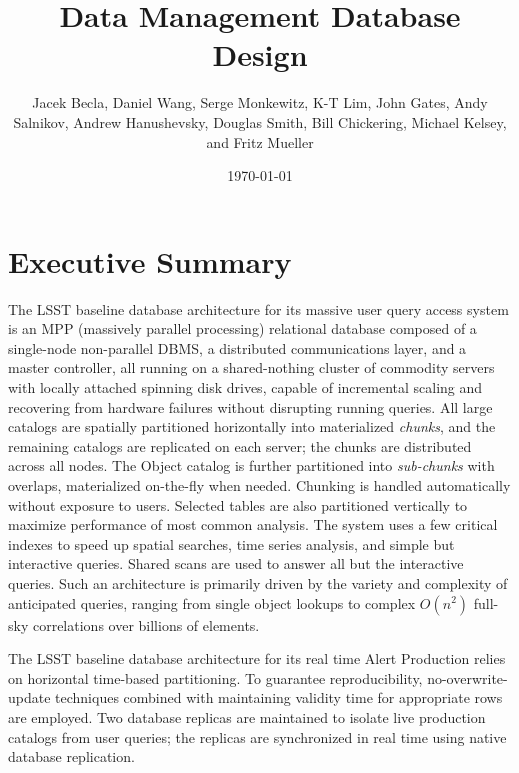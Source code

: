 \documentclass[DM,lsstdraft,toc]{lsstdoc}
\title{Data Management Database Design}
\author{%
	Jacek Becla,
	Daniel Wang,
	Serge Monkewitz,
	K-T Lim,
	John Gates,
	Andy Salnikov,
	Andrew Hanushevsky,
	Douglas Smith,
	Bill Chickering,
	Michael Kelsey,
	and
	Fritz Mueller
}
\date{\today}
\begin{document}
\makeatletter
\renewcommand{\l@section}{\@dottedtocline{1}{1.5em}{2.6em}}
\renewcommand{\l@subsection}{\@dottedtocline{2}{4.0em}{3.6em}}
\renewcommand{\l@subsubsection}{\@dottedtocline{3}{7.4em}{4.5em}}
\makeatother

\maketitle

\section{Executive Summary}\label{executive-summary}

The LSST baseline database architecture for its massive user query
access system is an MPP (massively parallel processing) relational
database composed of a single-node non-parallel DBMS, a distributed
communications layer, and a master controller, all running on a
shared-nothing cluster of commodity servers with locally attached
spinning disk drives, capable of incremental scaling and recovering from
hardware failures without disrupting running queries. All large catalogs
are spatially partitioned horizontally into materialized \emph{chunks},
and the remaining catalogs are replicated on each server; the chunks are
distributed across all nodes. The Object catalog is further partitioned
into \emph{sub-chunks} with overlaps, materialized on-the-fly when
needed. Chunking is handled automatically without exposure to users.
Selected tables are also partitioned vertically to maximize performance
of most common analysis. The system uses a few critical indexes to speed
up spatial searches, time series analysis, and simple but interactive
queries. Shared scans are used to answer all but the interactive
queries. Such an architecture is primarily driven by the variety and
complexity of anticipated queries, ranging from single object lookups to
complex \(O(n^2)\) full-sky correlations over billions of elements.

The LSST baseline database architecture for its real time Alert
Production relies on horizontal time-based partitioning. To guarantee
reproducibility, no-overwrite-update techniques combined with
maintaining validity time for appropriate rows are employed. Two
database replicas are maintained to isolate live production catalogs
from user queries; the replicas are synchronized in real time using
native database replication.
\end{document}
